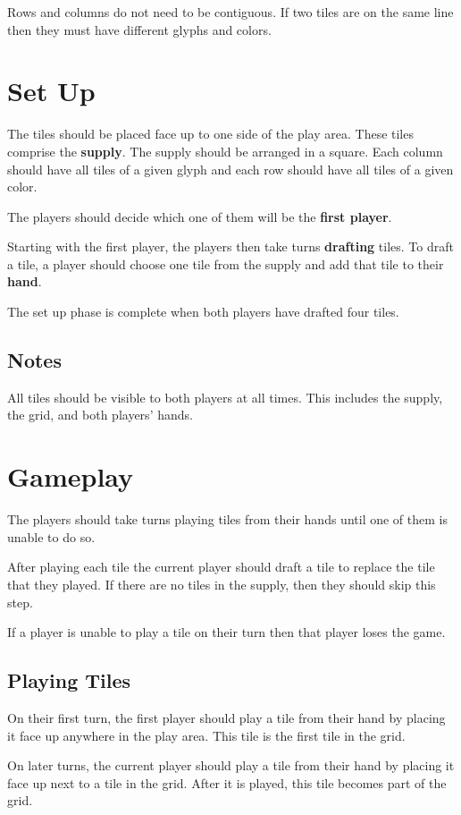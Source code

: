 \documentclass[a4paper, 10pt, notumble]{leaflet}
\begin{document}
Rows and columns do not need to be contiguous.
If two tiles are on the same line then they must have different glyphs and colors.

\section{Set Up}
The tiles should be placed face up to one side of the play area. These tiles comprise the \textbf{supply}. The supply should be arranged in a square. Each column should have all tiles of a given glyph and each row should have all tiles of a given color.

The players should decide which one of them will be the \textbf{first player}.

Starting with the first player, the players then take turns \textbf{drafting} tiles. To draft a tile, a player should choose one tile from the supply and add that tile to their \textbf{hand}.

The set up phase is complete when both players have drafted four tiles.

\subsection{Notes}
All tiles should be visible to both players at all times.  This includes the supply, the grid, and both players' hands.

\newpage

\section{Gameplay}
The players should take turns playing tiles from their hands until one of them is unable to do so.

After playing each tile the current player should draft a tile to replace the tile that they played. If there are no tiles in the supply, then they should skip this step.

If a player is unable to play a tile on their turn then that player loses the game.

\subsection{Playing Tiles}
On their first turn, the first player should play a tile from their hand by placing it face up anywhere in the play area. This tile is the first tile in the grid.

On later turns, the current player should play a tile from their hand by placing it face up next to a tile in the grid. After it is played, this tile becomes part of the grid.
\end{document}
